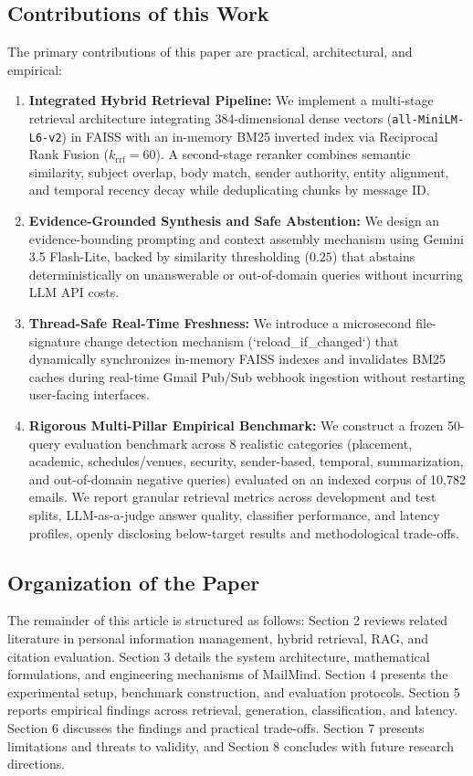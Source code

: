 \documentclass[11pt,a4paper]{article}
\begin{document}
\subsection{Contributions of this Work}
The primary contributions of this paper are practical, architectural, and empirical:
\begin{enumerate}
    \item \textbf{Integrated Hybrid Retrieval Pipeline:} We implement a multi-stage retrieval architecture integrating 384-dimensional dense vectors (\texttt{all-MiniLM-L6-v2}) in FAISS with an in-memory BM25 inverted index via Reciprocal Rank Fusion ($k_{\text{rrf}}=60$). A second-stage reranker combines semantic similarity, subject overlap, body match, sender authority, entity alignment, and temporal recency decay while deduplicating chunks by message ID.
    \item \textbf{Evidence-Grounded Synthesis and Safe Abstention:} We design an evidence-bounding prompting and context assembly mechanism using Gemini 3.5 Flash-Lite, backed by similarity thresholding ($0.25$) that abstains deterministically on unanswerable or out-of-domain queries without incurring LLM API costs.
    \item \textbf{Thread-Safe Real-Time Freshness:} We introduce a microsecond file-signature change detection mechanism (`reload\_if\_changed`) that dynamically synchronizes in-memory FAISS indexes and invalidates BM25 caches during real-time Gmail Pub/Sub webhook ingestion without restarting user-facing interfaces.
    \item \textbf{Rigorous Multi-Pillar Empirical Benchmark:} We construct a frozen 50-query evaluation benchmark across 8 realistic categories (placement, academic, schedules/venues, security, sender-based, temporal, summarization, and out-of-domain negative queries) evaluated on an indexed corpus of 10,782 emails. We report granular retrieval metrics across development and test splits, LLM-as-a-judge answer quality, classifier performance, and latency profiles, openly disclosing below-target results and methodological trade-offs.
\end{enumerate}

\subsection{Organization of the Paper}
The remainder of this article is structured as follows: Section 2 reviews related literature in personal information management, hybrid retrieval, RAG, and citation evaluation. Section 3 details the system architecture, mathematical formulations, and engineering mechanisms of MailMind. Section 4 presents the experimental setup, benchmark construction, and evaluation protocols. Section 5 reports empirical findings across retrieval, generation, classification, and latency. Section 6 discusses the findings and practical trade-offs. Section 7 presents limitations and threats to validity, and Section 8 concludes with future research directions.
\end{document}
